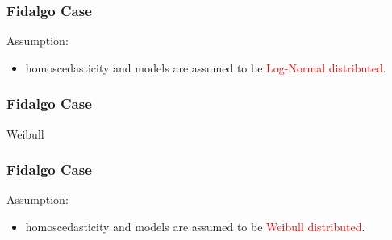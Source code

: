 \documentclass[xcolor=dvipsnames,aspectratio=1610]{beamer}
\begin{document}

\begin{frame}
\frametitle{Fidalgo Case}
Assumption:
\begin{itemize}
\item homoscedasticity and models are assumed to be \textcolor{red}{Log-Normal distributed}.
\end{itemize}
\begin{figure}
\end{figure}
\end{frame}


\begin{frame}
\frametitle{Fidalgo Case}
Weibull
\begin{figure}
\end{figure}
\end{frame}


\begin{frame}
\frametitle{Fidalgo Case}
Assumption:
\begin{itemize}
\item homoscedasticity and models are assumed to be \textcolor{red}{Weibull distributed}.
\end{itemize}
\begin{figure}
\end{figure}
\end{frame}
\end{document}
